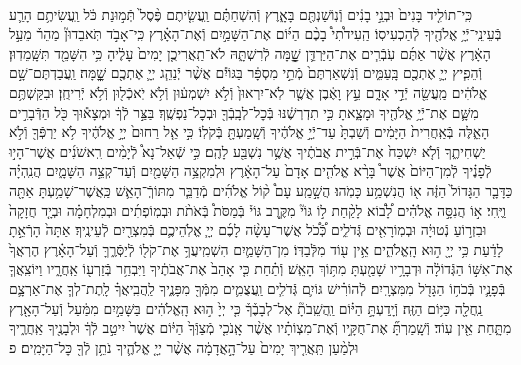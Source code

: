 \documentclass[twoside, openany, parskip=half, 11pt]{book}
\begin{document}
\begin{footnotesize}
\begin{multicols}{2}
\\
כִּֽי־תוֹלִ֤יד בָּנִים֙ וּבְנֵ֣י בָנִ֔ים וְֿנֽוֹשַׁנְתֶּ֖ם בָּאָ֑רֶץ וְֿהִשְׁחַתֶּ֗ם וַֽעֲשִׂ֤יתֶם פֶּ֨סֶל֙ תְּֿמ֣וּנַת כֹּ֔ל וַֽעֲשִׂיתֶ֥ם הָרַ֛ע בְּֿעֵינֵֽי־יְֿיָ֥ אֱלֹהֶ֖יךָ לְֿהַכְעִיסֽוֹ׃ הַֽעִידֹ֩תִי֩ בָכֶ֨ם הַיּ֜וֹם אֶת־הַשָּׁמַ֣יִם וְֿאֶת־הָאָ֗רֶץ כִּֽי־אָבֹ֣ד תֹּֽאבֵדוּן֘ מַהֵר֒ מֵעַ֣ל הָאָ֔רֶץ אֲשֶׁ֨ר אַתֶּ֜ם עֹֽבְֿרִ֧ים אֶת־הַיַּרְדֵּ֛ן שׇׇׇָׁ֖מָּה לְֿרִשְׁתָּ֑הּ לֹא־תַֽאֲרִיכֻ֤ן יָמִים֙ עָלֶ֔יהָ כִּ֥י הִשָּׁמֵ֖ד תִּשָּֽׁמֵדֽוּן׃ וְֿהֵפִ֧יץ יְיָ֛ אֶתְכֶ֖ם בָּֽעַמִּ֑ים וְֿנִשְׁאַרְתֶּם֙ מְֿתֵ֣י מִסְפָּ֔ר בַּגּוֹיִ֕ם אֲשֶׁ֨ר יְֿנַהֵ֧ג יְיָ֛ אֶתְכֶ֖ם שׇׇׇׇָֽׁמָּה׃ וַֽעֲבַדְתֶּם־שָׁ֣ם אֱלֹהִ֔ים מַֽעֲשֵׂ֖ה יְֿדֵ֣י אָדָ֑ם עֵ֣ץ וָאֶ֔בֶן אֲשֶׁ֤ר לֹֽא־יִרְאוּן֙ וְֿלֹ֣א יִשְׁמְע֔וּן וְֿלֹ֥א יֹֽאכְֿל֖וּן וְֿלֹ֥א יְֿרִיחֻֽן׃ וּבִקַּשְׁתֶּ֥ם מִשָּׁ֛ם אֶת־יְֿיָ֥ אֱלֹהֶ֖יךָ וּמָצָ֑אתָ כִּ֣י תִדְרְשֶׁ֔נּוּ בְּֿכׇל־לְבָֽבְֿךָ֖ וּבְכׇל־נַפְשֶֽׁךָ׃
בַּצַּ֣ר לְֿךָ֔ וּמְצָא֕וּךָ כֹּ֖ל הַדְּֿבָרִ֣ים הָאֵ֑לֶּה בְּֿאַֽחֲרִית֙ הַיָּמִ֔ים וְֿשַׁבְתָּ֙ עַד־יְֿיָ֣ אֱלֹהֶ֔יךָ וְֿשָֽׁמַעְתָּ֖ בְּֿקֹלֽוֹ׃ כִּ֣י אֵ֤ל רַחוּם֙ יְיָ֣ אֱלֹהֶ֔יךָ לֹ֥א יַרְפְּֿךָ֖ וְֿלֹ֣א יַשְׁחִיתֶ֑ךָ וְֿלֹ֤א יִשְׁכַּח֙ אֶת־בְּֿרִ֣ית אֲבֹתֶ֔יךָ אֲשֶׁ֥ר נִשְׁבַּ֖ע לָהֶֽם׃ כִּ֣י שְֿׁאַל־נָא֩ לְֿיָמִ֨ים רִֽאשֹׁנִ֜ים אֲשֶׁר־הָי֣וּ לְֿפָנֶ֗יךָ לְֿמִן־הַיּוֹם֙ אֲשֶׁר֩ בָּרָ֨א אֱלֹהִ֤ים אָדָם֙ עַל־הָאָ֔רֶץ וּלְמִקְצֵ֥ה הַשָּׁמַ֖יִם וְֿעַד־קְצֵ֣ה הַשָּׁמָ֑יִם הֲנִֽהְיָ֗ה כַּדָּבָ֤ר הַגָּדוֹל֙ הַזֶּ֔ה א֖וֹ הֲנִשְׁמַ֥ע כָּמֹֽהוּ׃ הֲשָׁ֣מַֽע עָם֩ ק֨וֹל אֱלֹהִ֜ים מְֿדַבֵּ֧ר מִתּוֹךְֿ־הָאֵ֛שׁ כַּֽאֲשֶׁר־שָׁמַ֥עְתָּ אַתָּ֖ה וַיֶּֽחִי׃ א֣וֹ הֲנִסָּ֣ה אֱלֹהִ֗ים לָ֠ב֠וֹא לָקַ֨חַת ל֣וֹ גּוֹי֘ מִקֶּ֣רֶב גּוֹי֒ בְּֿמַסֹּת֩ בְּֿאֹתֹ֨ת וּבְמֽוֹפְתִ֜ים וּבְמִלְחָמָ֗ה וּבְיָ֤ד חֲזָקָה֙ וּבִזְר֣וֹעַ נְֿטוּיָ֔ה וּבְמֽוֹרָאִ֖ים גְּֿדֹלִ֑ים כְּֿ֠כֹ֠ל אֲשֶׁר־עָשָׂ֨ה לָכֶ֜ם יְיָ֧ אֱלֹֽהֵיכֶ֛ם בְּֿמִצְרַ֖יִם לְֿעֵינֶֽיךָ׃ אַתָּה֙ הָרְֿאֵ֣תָ לָדַ֔עַת כִּ֥י יְיָ֖ ה֣וּא הָֽאֱלֹהִ֑ים אֵ֥ין ע֖וֹד מִלְּֿבַדּֽוֹ׃
מִן־הַשָּׁמַ֛יִם הִשְׁמִֽיעֲךָ֥ אֶת־קֹל֖וֹ לְֿיַסְּֿרֶ֑ךָּ וְֿעַל־הָאָ֗רֶץ הֶרְאֲךָ֙ אֶת־אִשּׁ֣וֹ הַגְּֿדוֹלָ֔ה וּדְבָרָ֥יו שָׁמַ֖עְתָּ מִתּ֥וֹךְ הָאֵֽשׁ׃ וְֿתַ֗חַת כִּ֤י אָהַב֙ אֶת־אֲבֹתֶ֔יךָ וַיִּבְחַ֥ר בְּֿזַרְע֖וֹ אַֽחֲרָ֑יו וַיּוֹצִֽאֲךָ֧ בְּֿפָנָ֛יו בְּֿכֹח֥וֹ הַגָּדֹ֖ל מִמִּצְרָֽיִם׃ לְֿהוֹרִ֗ישׁ גּוֹיִ֛ם גְּֿדֹלִ֧ים וַֽעֲצֻמִ֛ים מִמְּֿךָ֖ מִפָּנֶ֑יךָ לַֽהֲבִֽיאֲךָ֗ לָֽתֶת־לְךָ֧ אֶת־אַרְצָ֛ם נַֽחֲלָ֖ה כַּיּ֥וֹם הַזֶּֽה׃ וְֿיָֽדַעְתָּ֣ הַיּ֗וֹם וַֽהֲשֵֽׁבֹתָ֘ אֶל־לְבָבֶ֒ךָ֒ כִּ֤י יְיָ֙ ה֣וּא הָֽאֱלֹהִ֔ים בַּשָּׁמַ֣יִם מִמַּ֔עַל וְֿעַל־הָאָ֖רֶץ מִתָּ֑חַת אֵ֖ין עֽוֹד׃ וְֿשָֽׁמַרְתָּ֞ אֶת־חֻקָּ֣יו וְֿאֶת־מִצְוֹתָ֗יו אֲשֶׁ֨ר אָֽנֹכִ֤י מְֿצַוְּֿךָ֙ הַיּ֔וֹם אֲשֶׁר֙ יִיטַ֣ב לְֿךָ֔ וּלְבָנֶ֖יךָ אַֽחֲרֶ֑יךָ וּלְמַ֨עַן תַּֽאֲרִ֤יךְ יָמִים֙ עַל־הָ֣אֲדָמָ֔ה אֲשֶׁ֨ר יְיָ֤ אֱלֹהֶ֛יךָ נֹתֵ֥ן לְֿךָ֖ כׇּל־הַיָּמִֽים׃ פ


\end{multicols}
\end{footnotesize}
\end{document}
